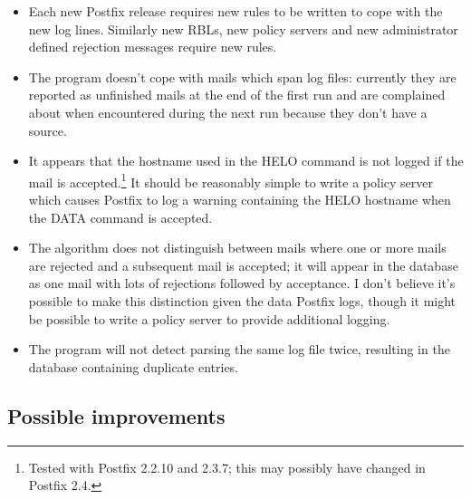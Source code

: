 \documentclass[a4paper,12pt,draft]{article}
\begin{document}
\begin{itemize}

    \item Each new Postfix release requires new rules to be written to cope
        with the new log lines.  Similarly new RBLs, new policy servers and
        new administrator defined rejection messages require new rules.

    \item The program doesn't cope with mails which span log files:
        currently they are reported as unfinished mails at the end of the
        first run and are complained about when encountered during the next
        run because they don't have a source.

    \item It appears that the hostname used in the HELO command is not
        logged if the mail is accepted.\footnote{Tested with Postfix 2.2.10
        and 2.3.7; this may possibly have changed in Postfix 2.4.}  It
        should be reasonably simple to write a policy server which causes
        Postfix to log a warning containing the HELO hostname when the DATA
        command is accepted.

    \item The algorithm does not distinguish between mails where one or
        more mails are rejected and a subsequent mail is accepted; it will
        appear in the database as one mail with lots of rejections followed
        by acceptance.  I don't believe it's possible to make this
        distinction given the data Postfix logs, though it might be
        possible to write a policy server to provide additional
        logging.

    \item The program will not detect parsing the same log file twice,
        resulting in the database containing duplicate entries.

\end{itemize}

\subsection{Possible improvements}
\end{document}
